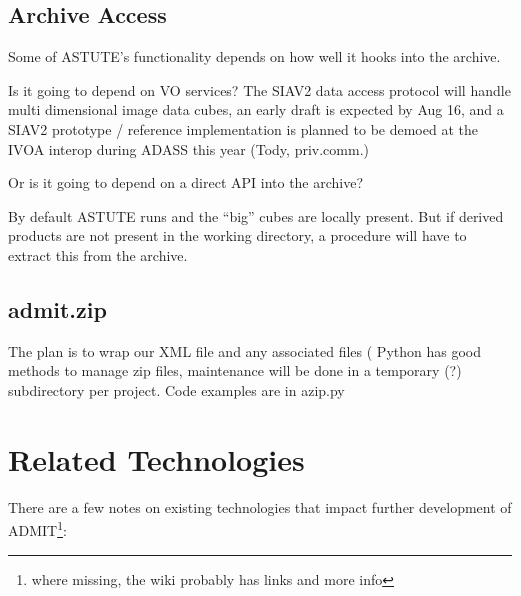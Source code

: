 \documentclass[preprint]{aastex} %
\begin{document}
\subsection{Archive Access}

Some of ASTUTE's functionality depends on how well it hooks into the archive.

Is it going to depend on VO services? The SIAV2 data access protocol
will handle multi dimensional image data cubes, an early draft is expected
by Aug 16, and a SIAV2 prototype / reference implementation is planned to 
be demoed at the IVOA interop during ADASS this year (Tody, priv.comm.)

Or is it going to depend on a direct API into the archive? 

By default ASTUTE runs and the ``big'' cubes are locally present. But if derived
products are not present in the working directory, a procedure will have to 
extract this from the archive.

\subsection{admit.zip}

The plan is to wrap our XML file and any associated files (
Python has good methods to manage zip files, maintenance will be done in 
a temporary (?) subdirectory per project. Code examples are in azip.py



\section{Related Technologies}

There are a few notes on existing technologies that 
impact further development of ADMIT\footnote{where missing, the wiki probably has 
links and more info}:
\end{document}
